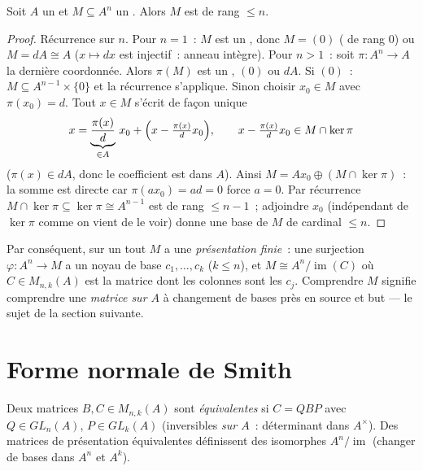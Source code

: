 \begin{theorem}\label{thm:b3:modules:submodule}
Soit $A$ un  et $M \subseteq A^n$ un . Alors $M$
est  de rang $\leq n$.
\end{theorem}

\begin{proof}
Récurrence sur $n$. Pour $n = 1$~: $M$ est un , donc $M =
(0)$ ( de rang $0$) ou $M = dA \cong A$ ($x \mapsto dx$
est injectif~: anneau intègre). Pour $n > 1$~: soit $\pi \colon
A^n \to A$ la dernière coordonnée. Alors $\pi(M)$ est un ,
$(0)$ ou $dA$. Si $(0)$~: $M \subseteq A^{n-1} \times \{0\}$ et
la récurrence s'applique. Sinon choisir $x_0 \in M$ avec
$\pi(x_0) = d$. Tout $x \in M$ s'écrit de façon unique
\[
x = \underbrace{\frac{\pi(x)}{d}}_{\in A}\, x_0 +
\Bigl(x - \tfrac{\pi(x)}d x_0\Bigr),
\qquad x - \tfrac{\pi(x)}d x_0 \in M \cap \ker\pi
\]
($\pi(x) \in dA$, donc le coefficient est dans $A$). Ainsi $M =
Ax_0 \oplus (M \cap \ker \pi)$~: la somme est directe car
$\pi(ax_0) = ad = 0$ force $a = 0$. Par récurrence $M \cap
\ker\pi \subseteq \ker \pi \cong A^{n-1}$ est  de rang
$\leq n - 1$~; adjoindre $x_0$ (indépendant de $\ker\pi$ comme
on vient de le voir) donne une base de $M$ de cardinal $\leq n$.
\end{proof}

\begin{remark}\label{rem:b3:modules:presentation}
Par conséquent, sur un  tout  $M$  a une
\emph{présentation finie}~: une surjection $\varphi\colon A^n
\to M$ a un noyau  de base $c_1, \dots, c_k$ ($k \leq n$),
et $M \cong A^n / \operatorname{im}(C)$ où $C \in M_{n,k}(A)$
est la matrice dont les colonnes sont les $c_j$. Comprendre $M$
signifie comprendre une \emph{matrice sur $A$} à changement de
bases près en source et but --- le sujet de la section suivante.
\end{remark}

\section{Forme normale de Smith}

\begin{definition}\label{def:b3:modules:equivalence}
Deux matrices $B, C \in M_{n,k}(A)$ sont \emph{équivalentes} si
$C = QBP$ avec $Q \in GL_n(A)$, $P \in GL_k(A)$ (inversibles
\emph{sur $A$}~: déterminant dans $A^\times$). Des matrices de
présentation équivalentes définissent des  isomorphes
$A^n/\operatorname{im}$ (changer de bases dans $A^n$ et $A^k$).
\end{definition}

